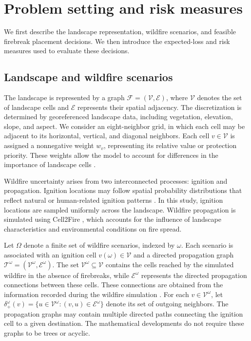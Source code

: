 \documentclass[a4paper,fleqn]{cas-sc}
\begin{document}
\section{Problem setting and risk measures}
\label{sec2}

We first describe the landscape representation, wildfire
scenarios, and feasible firebreak placement decisions.
We then introduce the expected-loss and risk measures
used to evaluate these decisions.

\subsection{Landscape and wildfire scenarios}

The landscape is represented by a graph
$\mathcal{F}=(\mathcal{V},\mathcal{E})$, where
$\mathcal{V}$ denotes the set of landscape cells and
$\mathcal{E}$ represents their spatial adjacency.
The discretization is determined by georeferenced
landscape data, including vegetation, elevation, slope,
and aspect. We consider an eight-neighbor grid, in
which each cell may be adjacent to its horizontal,
vertical, and diagonal neighbors. Each cell
$v\in\mathcal{V}$ is assigned a nonnegative weight
$w_v$, representing its relative value or protection
priority. These weights allow the model to account
for differences in the importance of landscape
cells \citep{carrasco2023firebreak}.

Wildfire uncertainty arises from two interconnected
processes: ignition and propagation. Ignition locations
may follow spatial probability distributions that reflect
natural or human-related ignition patterns
\citep{carrasco2021exploring}. In this study, ignition
locations are sampled uniformly across the landscape.
Wildfire propagation is simulated using Cell2Fire
\citep{pais2021cell2fire}, which accounts for the
influence of landscape characteristics and
environmental conditions on fire spread.

Let $\Omega$ denote a finite set of wildfire scenarios,
indexed by $\omega$. Each scenario is associated with
an ignition cell $v(\omega)\in\mathcal{V}$ and a
directed propagation graph
$\mathcal{T}^{\omega}
=(\mathcal{V}^{\omega},\mathcal{E}^{\omega})$.
The set $\mathcal{V}^{\omega}\subseteq\mathcal{V}$
contains the cells reached by the simulated wildfire
in the absence of firebreaks, while
$\mathcal{E}^{\omega}$ represents the directed
propagation connections between these cells.
These connections are obtained from the information
recorded during the wildfire simulation
\citep{pais2021downstream}. For each $v\in\mathcal{V}^{\omega}$, let 
$\delta_+^{\omega}(v)
=
\{u\in\mathcal{V}^{\omega}:
(v,u)\in\mathcal{E}^{\omega}\}$ 
denote its set of outgoing neighbors.
The propagation graphs may contain multiple
directed paths connecting the ignition cell to
a given destination. The mathematical developments
do not require these graphs to be trees or acyclic.
\end{document}
